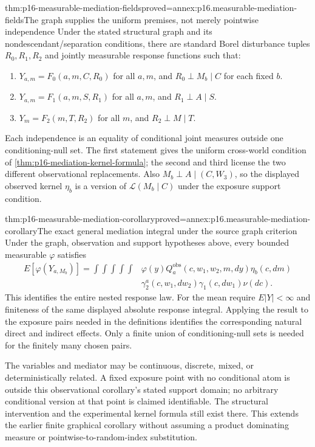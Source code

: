 \begin{hbtheorem}{thm:p16-measurable-mediation-fields}{proved=annex:p16.measurable-mediation-fields}{The graph supplies the uniform premises, not merely pointwise independence}
Under the stated structural graph and its nondescendant/separation
conditions, there are standard Borel disturbance tuples \(R_0,R_1,R_2\)
and jointly measurable response functions such that:
\begin{enumerate}
\item \(Y_{a,m}=F_0(a,m,C,R_0)\) for all \(a,m\), and
      \(R_0\perp M_b\mid C\) for each fixed \(b\).
\item \(Y_{a,m}=F_1(a,m,S,R_1)\) for all \(a,m\), and
      \(R_1\perp A\mid S\).
\item \(Y_m=F_2(m,T,R_2)\) for all \(m\), and
      \(R_2\perp M\mid T\).
\end{enumerate}
Each independence is an equality of conditional joint measures outside
one conditioning-null set. The first statement gives the uniform
cross-world condition of \cref{thm:p16-mediation-kernel-formula}; the
second and third license the two different observational replacements.
Also \(M_b\perp A\mid(C,W_3)\), so the displayed observed kernel
\(\eta_b\) is a version of \(\mathcal L(M_b\mid C)\) under the
exposure support condition.
\end{hbtheorem}

\begin{hbtheorem}{thm:p16-measurable-mediation-corollary}{proved=annex:p16.measurable-mediation-corollary}{The exact general mediation integral under the source graph criterion}
Under the graph, observation and support hypotheses above, every bounded
measurable \(\varphi\) satisfies
\[
\begin{aligned}
 E[\varphi(Y_{a,M_b})]
 =\int\!\int\!\int\!\int\!\int
 &\varphi(y)Q^{\mathrm{obs}}_a(c,w_1,w_2,m,dy)\eta_b(c,dm)\\
 &\gamma_2^a(c,w_1,dw_2)\gamma_1(c,dw_1)\nu(dc).
\end{aligned}
\]
This identifies the entire nested response law. For the mean require
\(E|Y|<\infty\) and finiteness of the same displayed absolute response
integral. Applying the result to the exposure pairs needed in the
definitions identifies the corresponding natural direct and indirect
effects. Only a finite union of conditioning-null sets is needed for
the finitely many chosen pairs.

The variables and mediator may be continuous, discrete, mixed, or
deterministically related. A fixed exposure point with no conditional
atom is outside this observational corollary's stated support domain;
no arbitrary conditional version at that point is claimed identifiable.
The structural intervention and the experimental kernel formula still
exist there. This extends the earlier finite graphical corollary without
assuming a product dominating measure or pointwise-to-random-index substitution.
\end{hbtheorem}

